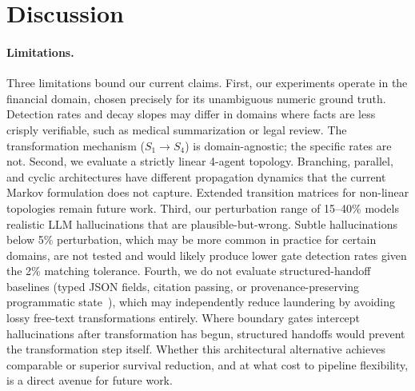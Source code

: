 \documentclass{article}
\theoremstyle{plain}
\theoremstyle{definition}
\theoremstyle{remark}
\begin{document}
\section{Discussion}

\paragraph{Limitations.} Three limitations bound our current claims. First, our experiments operate in the financial domain, chosen precisely for its unambiguous numeric ground truth. Detection rates and decay slopes may differ in domains where facts are less crisply verifiable, such as medical summarization or legal review. The transformation mechanism ($S_1{\to}S_4$) is domain-agnostic; the specific rates are not. Second, we evaluate a strictly linear 4-agent topology. Branching, parallel, and cyclic architectures have different propagation dynamics that the current Markov formulation does not capture. Extended transition matrices for non-linear topologies remain future work. Third, our perturbation range of 15--40\% models realistic LLM hallucinations that are plausible-but-wrong. Subtle hallucinations below 5\% perturbation, which may be more common in practice for certain domains, are not tested and would likely produce lower gate detection rates given the 2\% matching tolerance. Fourth, we do not evaluate structured-handoff baselines (typed JSON fields, citation passing, or provenance-preserving programmatic state~\cite{caveagent}), which may independently reduce laundering by avoiding lossy free-text transformations entirely. Where boundary gates intercept hallucinations after transformation has begun, structured handoffs would prevent the transformation step itself. Whether this architectural alternative achieves comparable or superior survival reduction, and at what cost to pipeline flexibility, is a direct avenue for future work.
\end{document}
